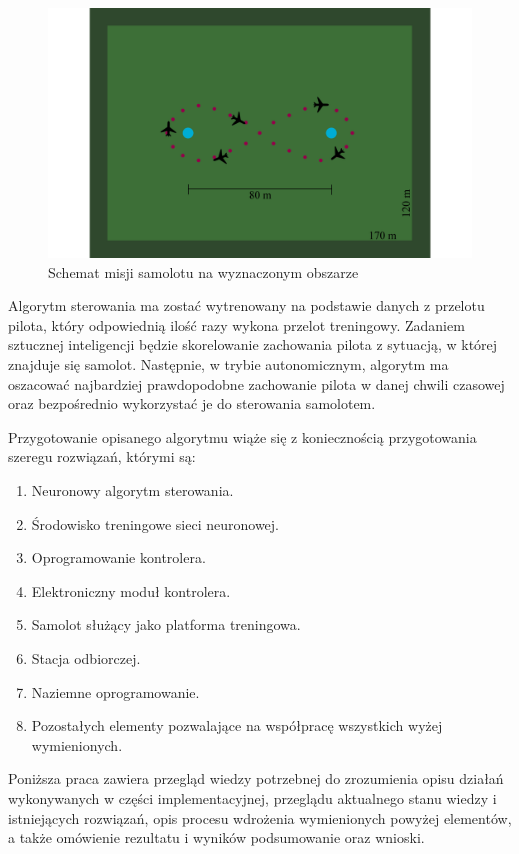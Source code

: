 \documentclass[12pt, a4paper]{article}
\begin{document}
\begin{figure}[ht]
    \centering
    \includegraphics[width=1\textwidth]{osemka}
    \caption{Schemat misji samolotu na wyznaczonym obszarze}
    \label{fig:osemka}
\end{figure}

Algorytm sterowania ma zostać wytrenowany na podstawie danych z przelotu pilota, który odpowiednią ilość razy wykona przelot treningowy. Zadaniem sztucznej inteligencji będzie skorelowanie zachowania pilota z sytuacją, w której znajduje się samolot. Następnie, w trybie autonomicznym, algorytm ma oszacować najbardziej prawdopodobne zachowanie pilota w danej chwili czasowej oraz bezpośrednio wykorzystać je do sterowania samolotem. 

Przygotowanie opisanego algorytmu wiąże się z koniecznością przygotowania szeregu rozwiązań, którymi są:
\begin{enumerate}
	\item Neuronowy algorytm sterowania.
	\item Środowisko treningowe sieci neuronowej.
	\item Oprogramowanie kontrolera.
	\item Elektroniczny moduł kontrolera.
	\item Samolot służący jako platforma treningowa.
	\item Stacja odbiorczej.
	\item Naziemne oprogramowanie.
	\item Pozostałych elementy pozwalające na współpracę wszystkich wyżej wymienionych.
\end{enumerate}

Poniższa praca zawiera przegląd wiedzy potrzebnej do zrozumienia opisu działań wykonywanych w części implementacyjnej, przeglądu aktualnego stanu wiedzy i istniejących rozwiązań, opis procesu wdrożenia wymienionych powyżej elementów, a także omówienie rezultatu i wyników podsumowanie oraz wnioski.
\end{document}
